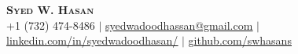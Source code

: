 \begin{center}
	\textbf{\Huge \scshape Syed W. Hasan} \\ \vspace{3.5pt}
    \small{+1 (732) 474-8486} $|$
    \href{mailto:syedwadoodhassan@gmail.com}{\underline{syedwadoodhassan@gmail.com}} $|$
    \href{www.linkedin.com/in/syedwadoodhasan/}{\underline{linkedin.com/in/syedwadoodhasan/}} $|$
    \href{https://github.com/swhasans}{\underline{github.com/swhasans}}
\end{center}